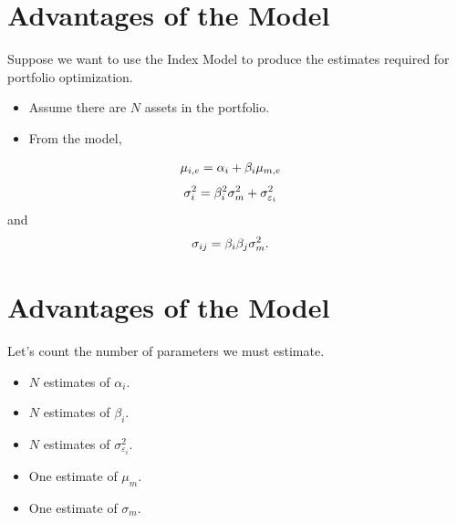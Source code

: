 \documentclass[letterpaper,10pt,english]{sphinxmanual}
\begin{document}
\section{Advantages of the Model}
\label{indexModels:advantages-of-the-model}
Suppose we want to use the Index Model to produce the estimates
required for portfolio optimization.
\begin{itemize}
\item {} 
Assume there are $N$ assets in the portfolio.

\end{itemize}
\begin{itemize}
\item {} 
From the model,

\end{itemize}
\begin{gather}
\begin{split}\mu_{i,e} & = \alpha_i + \beta_i \mu_{m,e}\end{split}\notag
\end{gather}\begin{gather}
\begin{split}\sigma^2_i & = \beta^2_i \sigma^2_m + \sigma^2_{\varepsilon_i}\end{split}\notag
\end{gather}
and
\begin{gather}
\begin{split}\sigma_{ij} & = \beta_i \beta_j \sigma^2_m.\end{split}\notag
\end{gather}

\section{Advantages of the Model}
\label{indexModels:id7}
Let's count the number of parameters we must estimate.
\begin{itemize}
\item {} 
$N$ estimates of $\alpha_i$.

\end{itemize}
\begin{itemize}
\item {} 
$N$ estimates of $\beta_i$.

\end{itemize}
\begin{itemize}
\item {} 
$N$ estimates of $\sigma^2_{\varepsilon_i}$.

\end{itemize}
\begin{itemize}
\item {} 
One estimate of $\mu_m$.

\end{itemize}
\begin{itemize}
\item {} 
One estimate of $\sigma_m$.

\end{itemize}
\end{document}
